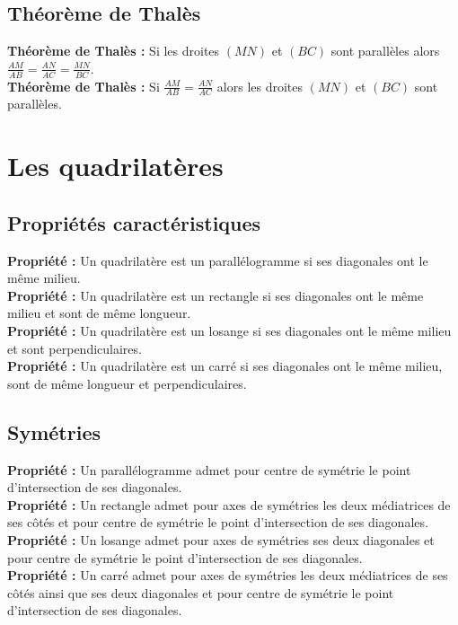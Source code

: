 \documentclass[a4paper,titlepage]{article}
\let\oldsection\section
\renewcommand\section{\clearpage\oldsection}
\begin{document}
    \subsection{Théorème de Thalès}
        \textbf{Théorème de Thalès :} Si les droites $\left(MN\right)$ et $\left(BC\right)$ sont parallèles alors $\frac{AM}{AB}=\frac{AN}{AC}=\frac{MN}{BC}$.
        \\
        \textbf{Théorème de Thalès :} Si $\frac{AM}{AB}=\frac{AN}{AC}$ alors les droites $\left(MN\right)$ et $\left(BC\right)$ sont parallèles.
\section{Les quadrilatères}
    \subsection{Propriétés caractéristiques}
        \textbf{Propriété :} Un quadrilatère est un parallélogramme si ses diagonales ont le même milieu.
        \\
        \textbf{Propriété :} Un quadrilatère est un rectangle si ses diagonales ont le même milieu et sont de même longueur.
        \\
        \textbf{Propriété :} Un quadrilatère est un losange si ses diagonales ont le même milieu et sont perpendiculaires.
        \\
        \textbf{Propriété :} Un quadrilatère est un carré si ses diagonales ont le même milieu, sont de même longueur et perpendiculaires.
    \subsection{Symétries}
        \textbf{Propriété :} Un parallélogramme admet pour centre de symétrie le point d’intersection de ses diagonales.
        \\
        \textbf{Propriété :} Un rectangle admet pour axes de symétries les deux médiatrices de ses côtés et pour centre de symétrie le point d’intersection de ses diagonales.
        \\
        \textbf{Propriété :} Un losange admet pour axes de symétries ses deux diagonales et pour centre de symétrie le point d’intersection de ses diagonales.
        \\
        \textbf{Propriété :} Un carré admet pour axes de symétries les deux médiatrices de ses côtés ainsi que ses deux diagonales et pour centre de symétrie le point d’intersection de ses diagonales.
\end{document}
